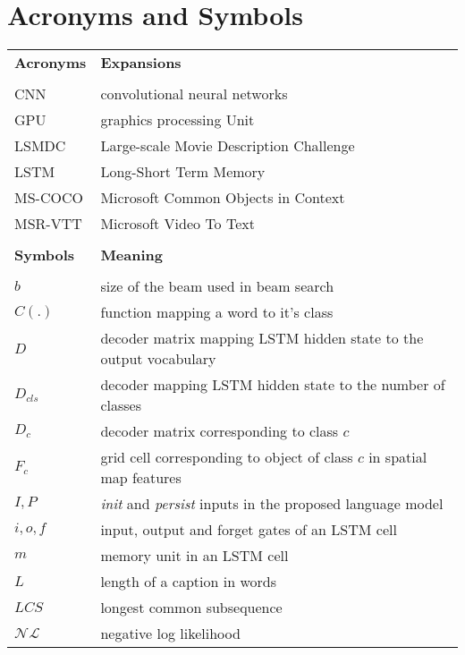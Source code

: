 \chapter*{Acronyms and Symbols}


\noindent
\renewcommand*{\arraystretch}{1.4} 
\begin{longtable}{@{}p{}p{}@{}}
        \bf Acronyms & \bf Expansions\\\\
        CNN & convolutional neural networks\\
        GPU & graphics processing Unit \\
        LSMDC   & Large-scale Movie Description Challenge\\
        LSTM   & Long-Short Term Memory \\
        MS-COCO & Microsoft Common Objects in Context \\
        MSR-VTT& Microsoft Video To Text\\
        \\
        \bf Symbols & \bf Meaning\\\\
        $b$   & size of the beam used in beam search\\
        $C(.)$ & function mapping a word to it's class\\
        $D$ & decoder matrix mapping LSTM hidden state to the output vocabulary\\
        $D_{cls}$ & decoder mapping LSTM hidden state to the number of classes\\
        $D_{c}$ & decoder matrix corresponding to class $c$\\
        $F_c$ & grid cell corresponding to object of class $c$ in spatial map
        features\\
        $I, P$ & \emph{init} and \emph{persist} inputs in the proposed language
        model\\
        $i, o, f $ & input, output and forget gates of an LSTM cell \\
        $m$ & memory unit in an LSTM cell \\
        $L$   & length of a caption in words\\
        $LCS$   & longest common subsequence\\
        $\mathcal{NL}$ & negative log likelihood \\

\end{longtable}
